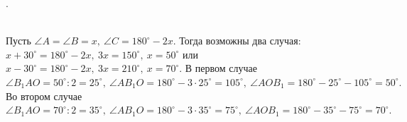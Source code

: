 \documentclass[12pt]{article}
\begin{document}
. \begin{figure}[ht!]
\end{figure}\\
Пусть $\angle A=\angle B=x,\ \angle C=180^\circ-2x.$ Тогда возможны два случая: $x+30^\circ=180^\circ-2x,\ 3x=150^\circ,\ x=50^\circ$ или $x-30^\circ=180^\circ-2x,\
3x=210^\circ,\ x=70^\circ.$ В первом случае  $\angle B_1AO=50^\circ:2=25^\circ,\ \angle AB_1O=180^\circ-3\cdot25^\circ=105^\circ,\ \angle AOB_1=180^\circ-25^\circ-105^\circ=50^\circ.$ Во втором случае  $\angle B_1AO=70^\circ:2=35^\circ,\ \angle AB_1O=180^\circ-3\cdot35^\circ=75^\circ,\ \angle AOB_1=180^\circ-35^\circ-75^\circ=70^\circ.$\\
\end{document}
